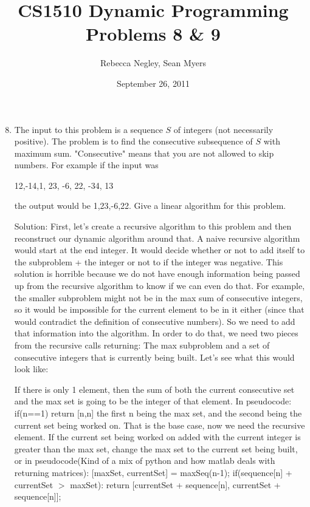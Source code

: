 \documentclass{article}
\title{CS1510  Dynamic Programming Problems 8 \& 9}
\author{Rebecca Negley, Sean Myers}
\date{September 26, 2011}
\begin{document}
\maketitle

\begin{enumerate}
\setcounter{enumi}{7}
\item 
The input to this problem is a sequence $S$ of integers (not necessarily positive). The problem is to find
\newline the consecutive subsequence of $S$ with maximum sum. "Consecutive" means that you are not allowed
\newline to skip numbers. For example if the input was
\begin{center}
12,-14,1, 23, -6, 22, -34, 13
\end{center}

the output would be 1,23,-6,22. Give a linear algorithm for this problem.
\newline

Solution: First, let's create a recursive algorithm to this problem and then reconstruct our dynamic algorithm around that. A naive recursive algorithm would start at the end integer. It would decide whether or not to add itself to the subproblem + the integer or not to if the integer was negative. This solution is horrible because we do not have enough information being passed up from the recursive algorithm to know if we can even do that. For example, the smaller subproblem might not be in the max sum of consecutive integers, so it would be impossible for the current element to be in it either (since that would contradict the definition of consecutive numbers). So we need to add that information into the algorithm. In order to do that, we need two pieces from the recursive calls returning: The max subproblem and a set of consecutive integers that is currently being built. Let's see what this would look like:

If there is only 1 element, then the sum of both the current consecutive set and the max set is going to be the integer of that element. In pseudocode:
if(n==1){ return [n,n] }
the first n being the max set, and the second being the current set being worked on. That is the base case, now we need the recursive element. If the current set being worked on added with the current integer is greater than the max set, change the max set to the current set being built, or in pseudocode(Kind of a mix of python and how matlab deals with returning matrices):
[maxSet, currentSet] = maxSeq(n-1);
if(sequence[n] + currentSet $>$ maxSet):
  return [currentSet + sequence[n], currentSet + sequence[n]];


\end{enumerate}
\end{document}
